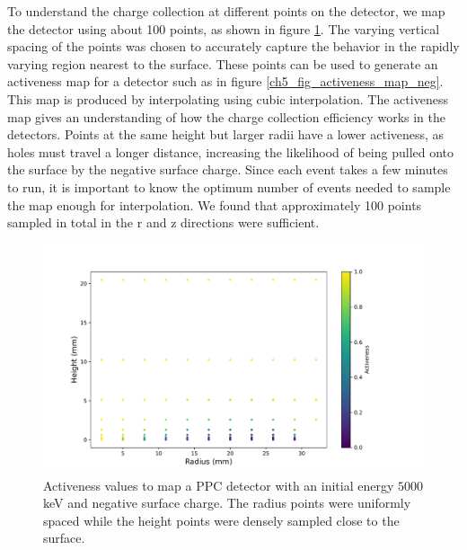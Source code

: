 To understand the charge collection at different points on the detector, we map the detector using about 100 points, as shown in figure \ref{ch5_fig_activeness_points_neg}. The varying vertical spacing of the points was chosen to accurately capture the behavior in the rapidly varying region nearest to the surface. These points can be used to generate an activeness map for a detector such as in figure \ref{ch5_fig_activeness_map_neg}. This map is produced by interpolating using cubic interpolation. The activeness map gives an understanding of how the charge collection efficiency works in the detectors. Points at the same height but larger radii have a lower activeness, as holes must travel a longer distance, increasing the likelihood of being pulled onto the surface by the negative surface charge. Since each event takes a few minutes to run, it is important to know the optimum number of events needed to sample the map enough for interpolation. We found that approximately 100 points sampled in total in the r and z directions were sufficient.

\begin{figure}%
\includegraphics[trim={0cm 0.5cm 3.2cm 1.15cm},clip,width=0.95\linewidth]{ch5/figs/activenss_map_ponama_1_-0.3_5000.pdf}
\caption{Activeness values to map a PPC detector \ehd with an initial energy $5000$ keV and negative surface charge. The radius points were uniformly spaced while the height points were densely sampled close to the surface.}
\label{ch5_fig_activeness_points_neg}
\end{figure}

